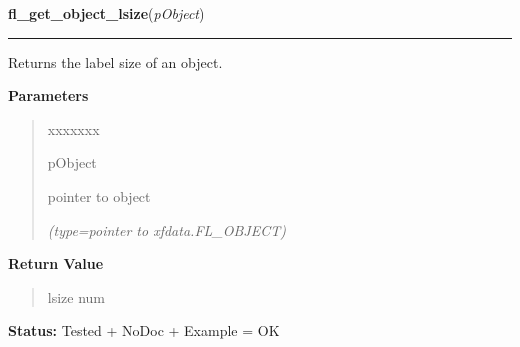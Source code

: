 \hspace{.8\funcindent}\begin{boxedminipage}{\funcwidth}

    \raggedright \textbf{fl\_get\_object\_lsize}(\textit{pObject})

    \vspace{-1.5ex}

    \rule{\textwidth}{0.5\fboxrule}
\setlength{\parskip}{2ex}
    Returns the label size of an object.

\setlength{\parskip}{1ex}
      \textbf{Parameters}
      \vspace{-1ex}

      \begin{quote}
        \begin{Ventry}{xxxxxxx}

          \item[pObject]

          pointer to object

            {\it (type=pointer to xfdata.FL\_OBJECT)}

        \end{Ventry}

      \end{quote}

      \textbf{Return Value}
    \vspace{-1ex}

      \begin{quote}
      lsize num

      \end{quote}

\textbf{Status:} Tested + NoDoc + Example = OK



    \end{boxedminipage}

    \label{xformslib:library:fl_set_object_lstyle}

    \vspace{0.5ex}

